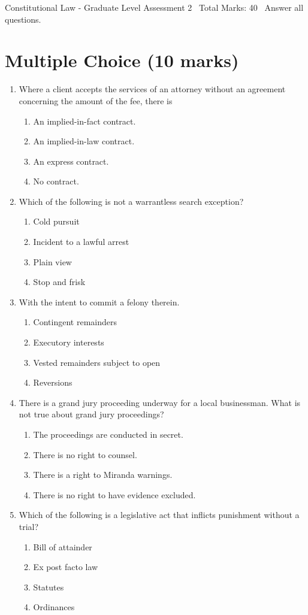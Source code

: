 \documentclass[12pt]{article}
\begin{document}
\begin{center}
Constitutional Law - Graduate Level Assessment 2 \
Total Marks: 40 \
Answer all questions.
\end{center}

\section*{Multiple Choice (10 marks)}
\begin{enumerate}[label=\arabic*.]
\item Where a client accepts the services of an attorney without an agreement concerning the amount of the fee, there is
\begin{enumerate}[label=(\alph*)]
    \item An implied-in-fact contract.
    \item An implied-in-law contract.
    \item An express contract.
    \item No contract.
\end{enumerate}
\item Which of the following is not a warrantless search exception?
\begin{enumerate}[label=(\alph*)]
    \item Cold pursuit
    \item Incident to a lawful arrest
    \item Plain view
    \item Stop and frisk
\end{enumerate}
\item With the intent to commit a felony therein.
\begin{enumerate}[label=(\alph*)]
    \item Contingent remainders
    \item Executory interests
    \item Vested remainders subject to open
    \item Reversions
\end{enumerate}
\item There is a grand jury proceeding underway for a local businessman. What is not true about grand jury proceedings?
\begin{enumerate}[label=(\alph*)]
    \item The proceedings are conducted in secret.
    \item There is no right to counsel.
    \item There is a right to Miranda warnings.
    \item There is no right to have evidence excluded.
\end{enumerate}
\item Which of the following is a legislative act that inflicts punishment without a trial?
\begin{enumerate}[label=(\alph*)]
    \item Bill of attainder
    \item Ex post facto law
    \item Statutes
    \item Ordinances
\end{enumerate}
\end{enumerate}
\end{document}
